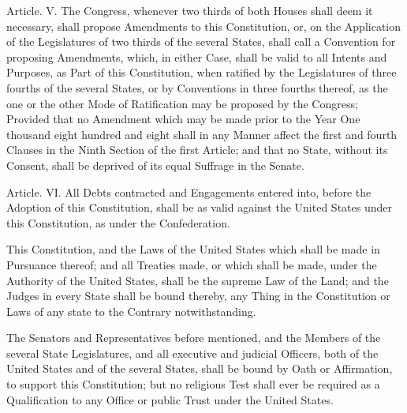 \documentclass{article}
\begin{document}
Article. V.  The Congress, whenever two thirds of both Houses shall deem
it necessary, shall propose Amendments to this Constitution, or, on the
Application of the Legislatures of two thirds of the several States,
shall call a Convention for proposing Amendments, which, in either Case,
shall be valid to all Intents and Purposes, as Part of this
Constitution, when ratified by the Legislatures of three fourths of the
several States, or by Conventions in three fourths thereof, as the one
or the other Mode of Ratification may be proposed by the Congress;
Provided that no Amendment which may be made prior to the Year One
thousand eight hundred and eight shall in any Manner affect the first
and fourth Clauses in the Ninth Section of the first Article; and that
no State, without its Consent, shall be deprived of its equal Suffrage
in the Senate.

Article. VI.  All Debts contracted and Engagements entered into, before
the Adoption of this Constitution, shall be as valid against the United
States under this Constitution, as under the Confederation.

This Constitution, and the Laws of the United States which shall be made
in Pursuance thereof; and all Treaties made, or which shall be made,
under the Authority of the United States, shall be the supreme Law of
the Land; and the Judges in every State shall be bound thereby, any
Thing in the Constitution or Laws of any state to the Contrary
notwithstanding.

The Senators and Representatives before mentioned, and the Members of
the several State Legislatures, and all executive and judicial Officers,
both of the United States and of the several States, shall be bound by
Oath or Affirmation, to support this Constitution; but no religious Test
shall ever be required as a Qualification to any Office or public Trust
under the United States.
\end{document}

